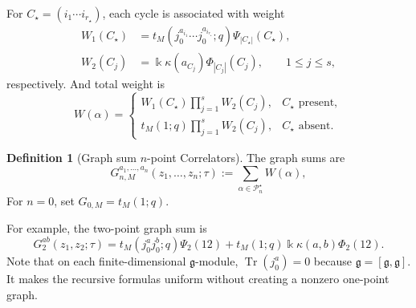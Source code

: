 \documentclass[11pt,a4paper]{amsart}
\numberwithin{equation}{section}
\theoremstyle{definition}
\newtheorem{definition}[theorem]{Definition}
\theoremstyle{remark}
\DeclareMathOperator{\Tr}{Tr}
\newcommand{\g}{\mathfrak g}
\newcommand{\kk}{\Bbbk}
\newcommand{\cP}{\mathcal P}
\begin{document}
For $C_\star=(i_1\cdots i_{r_\star})$, each cycle is associated with weight
\[
\begin{aligned}
 W_1(C_\star)
 &=t_M(j_0^{a_{i_1}}\cdots
   j_0^{a_{i_{r_\star}}};q)\Psi_{|C_\star|}(C_\star),\\
 W_2(C_j)
 &=\kk\kappa(a_{C_j})\Phi_{|C_j|}(C_j),\qquad 1\leq j\leq s,
 \end{aligned}
\]
respectively. And total weight is
\[
 W(\alpha)
 =\begin{cases}
\displaystyle
W_1(C_\star)\prod_{j=1}^sW_2(C_j),
& C_\star\text{ present},\\[3ex]
\displaystyle
t_M(1;q)\prod_{j=1}^sW_2(C_j),
& C_\star\text{ absent}.
\end{cases}
\]

\begin{definition}[Graph sum $n$-point Correlators]
\label{def:graph-sums}
The graph sums are
\begin{equation}
 G_{n,M}^{a_1,\ldots,a_n}(z_1,\ldots,z_n;\tau):=
 \sum_{\alpha\in\cP_n^\star}W(\alpha),
\end{equation}
For $n=0$, set $G_{0,M}=t_M(1;q)$.
\end{definition}

For example, the two-point graph sum is
\begin{equation}
 G_2^{ab}(z_1,z_2;\tau)
 =t_M(j_0^a j_0^b;q)\Psi_2(12)
 +t_M(1;q)\kk\kappa(a,b)\Phi_2(12).
 \label{eq:two-point-graph}
\end{equation}
Note that on each finite-dimensional $\g$-module, $\Tr(j_0^a)=0$ because $\g=[\g,\g]$.  It makes the recursive formulas uniform without creating a nonzero one-point graph.
\end{document}
